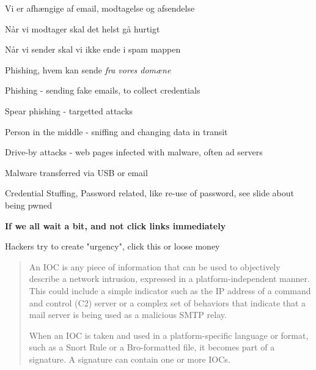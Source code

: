 \documentclass[Screen16to9,17pt]{foils}
\begin{document}


\begin{list2}
\item Vi er afhængige af email, modtagelse og afsendelse
\item Når vi modtager skal det helst gå hurtigt
\item Når vi sender skal vi ikke ende i spam mappen
\item Phishing, hvem kan sende \emph{fra vores domæne}
\end{list2}



\begin{list2}
\item Phishing - sending fake emails, to collect credentials
\item Spear phishing - targetted attacks
\item Person in the middle - sniffing and changing data in transit
\item Drive-by attacks - web pages infected with malware, often ad servers
\item Malware transferred via USB or email
\item Credential Stuffing, Password related, like re-use of password, see slide about being pwned
\end{list2}

\vskip 1cm
\centerline{\Large\bf If we all wait a bit, and not click links immediately}

\vskip 1cm
Hackers try to create "urgency", click this or loose money



\begin{quote}
An IOC is any piece of information that can be used to objectively describe a
network intrusion, expressed in a platform-independent manner. This could include a simple indicator such as the IP address of a command and control (C2) server or a complex set of behaviors that indicate that a mail server is being used as a malicious SMTP relay.

When an IOC is taken and used in a platform-specific language or format, such as a Snort Rule or a Bro-formatted file, it becomes part of a signature. A signature can contain one or more IOCs.
\end{quote}
\end{document}
